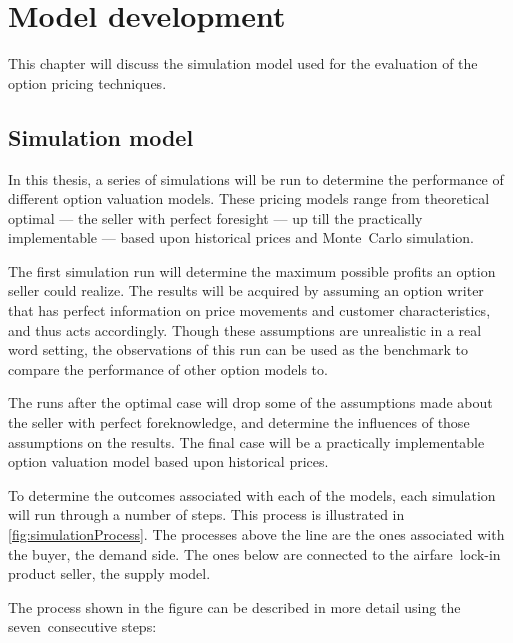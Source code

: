 \chapter{Model development}
\label{chap:ModelDevelopment}
This chapter will discuss the simulation model used for the evaluation of the option pricing techniques. 

\section{Simulation model}
\label{sec:SimulationModel}
In this thesis, a series of simulations will be run to determine the performance of different option valuation models. These pricing models range from theoretical optimal --- the seller with perfect foresight --- up till the practically implementable --- based upon historical prices and Monte~Carlo simulation.

The first simulation run will determine the maximum possible profits an option seller could realize. The results will be acquired by assuming an option writer that has perfect information on price movements and customer characteristics, and thus acts accordingly. Though these assumptions are unrealistic in a real word setting, the observations of this run can be used as the benchmark to compare the performance of other option models to.

The runs after the optimal case will drop some of the assumptions made about the seller with perfect foreknowledge, and determine the influences of those assumptions on the results. The final case will be a practically implementable option valuation model based upon historical prices.

To determine the outcomes associated with each of the models, each simulation will run through a number of steps. This process is illustrated in \autoref{fig:simulationProcess}. The processes above the line are the ones associated with the buyer, the demand side. The ones below are connected to the airfare~lock-in product seller, the supply model.


The process shown in the figure can be described in more detail using the seven~consecutive steps:

